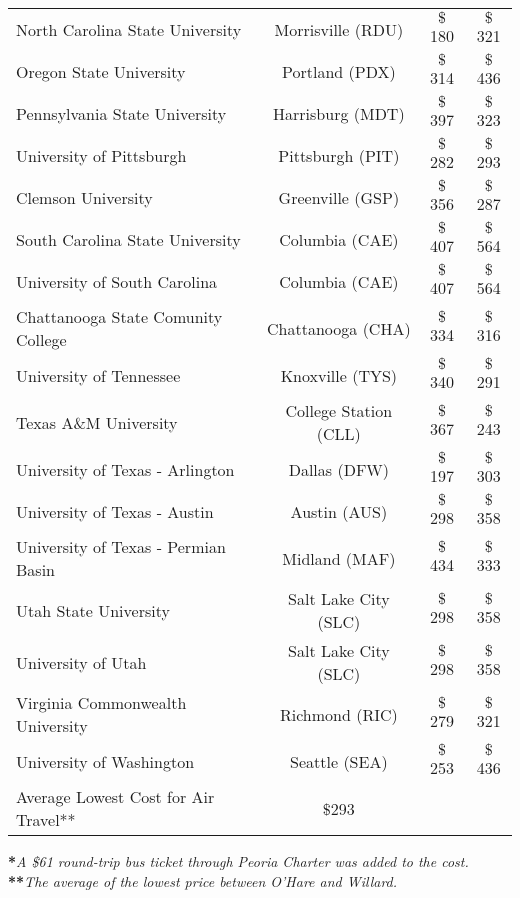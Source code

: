 \begin{table}[H]
\begin{tabular}{lccc}
    North Carolina State University &Morrisville (RDU) &$\$$180 &$\$$321 \\
    Oregon State University &Portland (PDX) &$\$$314 &$\$$436 \\ 
    Pennsylvania State University & Harrisburg (MDT)&$\$$397 & $\$$323 \\
    University of Pittsburgh &Pittsburgh (PIT) &$\$$282 &$\$$293 \\ 
    Clemson University&Greenville (GSP)&$\$$356&$\$$287\\
    South Carolina State University&Columbia (CAE)&$\$$407 &$\$$564 \\ 
    University of South Carolina&Columbia (CAE)&$\$$407&$\$$564\\
    Chattanooga State Comunity College&Chattanooga (CHA)&$\$$334&$\$$316\\
    University of Tennessee&Knoxville (TYS)&$\$$340&$\$$291\\
    Texas A\&M University&College Station (CLL)&$\$$367&$\$$243\\
    University of Texas - Arlington&Dallas (DFW)&$\$$197&$\$$303\\
    University of Texas - Austin&Austin (AUS)&$\$$298&$\$$358\\
    University of Texas - Permian Basin&Midland (MAF)&$\$$434&$\$$333\\
    Utah State University&Salt Lake City (SLC)&$\$$298&$\$$358\\
    University of Utah&Salt Lake City (SLC)&$\$$298&$\$$358\\
    Virginia Commonwealth University&Richmond (RIC)&$\$$279&$\$$321\\
    University of Washington&Seattle (SEA)&$\$$253&$\$$436\\
    \hline
    Average Lowest Cost for Air Travel**&$\$$293&&
    \end{tabular} 
\end{table}

\noindent\textbf{*}\textit{A \$61 round-trip bus ticket through Peoria Charter was added to the cost.}\\
\textbf{**}\textit{The average of the lowest price between O'Hare and Willard.}\\


